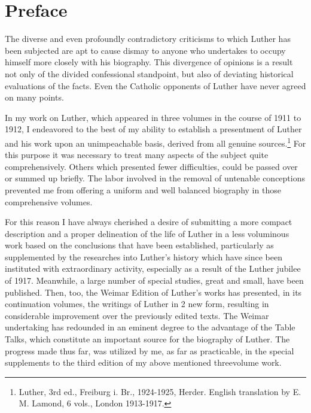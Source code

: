 \chapter*{Preface} %

The diverse and even profoundly contradictory criticisms to which
Luther has been subjected are apt to cause dismay to anyone who
undertakes to occupy himself more closely with his biography. This
divergence of opinions is a result not only of the divided confessional standpoint, but also of deviating historical evaluations of the
facts. Even the Catholic opponents of Luther have never agreed on many points.

In my work on Luther, which appeared in three volumes in the course of 1911 to 1912,
I endeavored to the best of my ability to establish a presentment of Luther and his work upon an unimpeachable basis,
derived from all genuine sources.\footnote{Luther, 3rd ed., Freiburg i. Br., 1924-1925, Herder. English translation by E. M. Lamond, 6 vols., London 1913-1917.}
For this purpose it was necessary to treat many aspects of the subject quite comprehensively. Others which presented fewer difficulties, could be passed over
or summed up briefly. The labor involved in the removal of untenable
conceptions prevented me from offering a uniform and well balanced biography in those comprehensive volumes.

For this reason I have always cherished a desire of submitting a
more compact description and a proper delineation of the life of
Luther in a less voluminous work based on the conclusions that
have been established, particularly as supplemented by the researches
into Luther’s history which have since been instituted with extraordinary activity, especially as a result of the Luther jubilee of
1917. Meanwhile, a large number of special studies, great and small,
have been published. Then, too, the Weimar Edition of Luther’s
works has presented, in its continuation volumes, the writings of Luther in 2 new form, resulting in considerable improvement over the
previously edited texts. The Weimar undertaking has redounded in
an eminent degree to the advantage of the Table Talks, which constitute an important source for the biography of Luther.
The progress made thus far, was utilized by me, as far as practicable, in the special supplements to the third edition of my above mentioned threevolume work.

